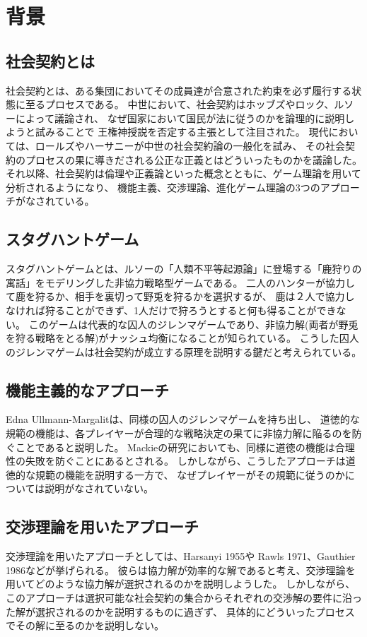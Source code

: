 \chapter{背景}
\section{社会契約とは}
社会契約とは、ある集団においてその成員達が合意された約束を必ず履行する状態に至るプロセスである。
中世において、社会契約はホッブズやロック、ルソーによって議論され、
なぜ国家において国民が法に従うのかを論理的に説明しようと試みることで
王権神授説を否定する主張として注目された。
現代においては、ロールズやハーサニーが中世の社会契約論の一般化を試み、
その社会契約のプロセスの果に導きだされる公正な正義とはどういったものかを議論した。
それ以降、社会契約は倫理や正義論といった概念とともに、ゲーム理論を用いて分析されるようになり、
機能主義、交渉理論、進化ゲーム理論の3つのアプローチがなされている。\cite{sep-game-ethics}

\section{スタグハントゲーム}

スタグハントゲームとは、ルソーの「人類不平等起源論」\cite{rousseau1999discourse}に登場する「鹿狩りの寓話」をモデリングした非協力戦略型ゲームである。\cite{skyrms2001}
二人のハンターが協力して鹿を狩るか、相手を裏切って野兎を狩るかを選択するが、
鹿は２人で協力しなければ狩ることができず、1人だけで狩ろうとすると何も得ることができない。
このゲームは代表的な囚人のジレンマゲームであり、非協力解(両者が野兎を狩る戦略をとる解)がナッシュ均衡になることが知られている。
こうした囚人のジレンマゲームは社会契約が成立する原理を説明する鍵だと考えられている。\cite{skyrms2001}

\section{機能主義的なアプローチ}
Edna Ullmann-Margalitは、同様の囚人のジレンマゲームを持ち出し、
道徳的な規範の機能は、各プレイヤーが合理的な戦略決定の果てに非協力解に陥るのを防ぐことであると説明した。\cite{edna1977}
Mackieの研究においても、同様に道徳の機能は合理性の失敗を防ぐことにあるとされる。\cite{machie1977ethics}
しかしながら、こうしたアプローチは道徳的な規範の機能を説明する一方で、
なぜプレイヤーがその規範に従うのかについては説明がなされていない。

\section{交渉理論を用いたアプローチ}
\label{bargaining-theory}
交渉理論を用いたアプローチとしては、Harsanyi 1955\cite{harsanyi1955}や
Rawls 1971\cite{rawls1971}、Gauthier 1986\cite{gauthier1986}などが挙げられる。
彼らは協力解が効率的な解であると考え、交渉理論を用いてどのような協力解が選択されるのかを説明しようした。
しかしながら、このアプローチは選択可能な社会契約の集合からそれぞれの交渉解の要件に沿った解が選択されるのかを説明するものに過ぎず、
具体的にどういったプロセスでその解に至るのかを説明しない。

